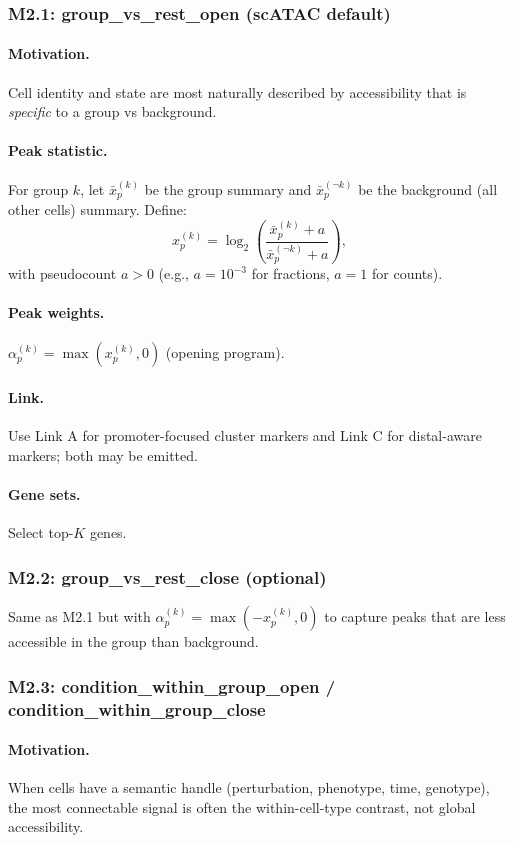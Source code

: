 \documentclass[11pt]{article}
\begin{document}
\subsubsection{M2.1: group\_vs\_rest\_open (scATAC default)}
\paragraph{Motivation.} Cell identity and state are most naturally described by accessibility that is \emph{specific} to a group vs background.
\paragraph{Peak statistic.} For group $k$, let $\bar{x}^{(k)}_p$ be the group summary and $\bar{x}^{(\neg k)}_p$ be the background (all other cells) summary. Define:
\begin{equation}
x_p^{(k)} = \log_2\left(\frac{\bar{x}^{(k)}_p + a}{\bar{x}^{(\neg k)}_p + a}\right),
\label{eq:group_vs_rest_logfc}
\end{equation}
with pseudocount $a>0$ (e.g., $a=10^{-3}$ for fractions, $a=1$ for counts).
\paragraph{Peak weights.} $\alpha_p^{(k)} = \max(x_p^{(k)},0)$ (opening program).
\paragraph{Link.} Use Link A for promoter-focused cluster markers and Link C for distal-aware markers; both may be emitted.
\paragraph{Gene sets.} Select top-$K$ genes.

\subsubsection{M2.2: group\_vs\_rest\_close (optional)}
Same as M2.1 but with $\alpha_p^{(k)} = \max(-x_p^{(k)},0)$ to capture peaks that are less accessible in the group than background.

\subsubsection{M2.3: condition\_within\_group\_open / condition\_within\_group\_close}
\paragraph{Motivation.} When cells have a semantic handle (perturbation, phenotype, time, genotype), the most connectable signal is often the within-cell-type contrast, not global accessibility.
\end{document}
